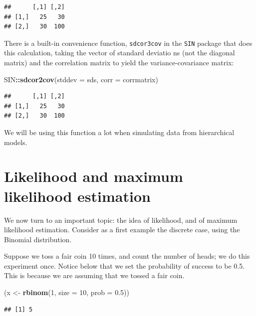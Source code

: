 \documentclass[12pt,]{krantz}
\newenvironment{Shaded}{\begin{snugshade}}{\end{snugshade}}
\newcommand{\DataTypeTok}[1]{\textcolor[rgb]{0.13,0.29,0.53}{#1}}
\newcommand{\DecValTok}[1]{\textcolor[rgb]{0.00,0.00,0.81}{#1}}
\newcommand{\FloatTok}[1]{\textcolor[rgb]{0.00,0.00,0.81}{#1}}
\newcommand{\KeywordTok}[1]{\textcolor[rgb]{0.13,0.29,0.53}{\textbf{#1}}}
\newcommand{\NormalTok}[1]{#1}
\newcommand{\OperatorTok}[1]{\textcolor[rgb]{0.81,0.36,0.00}{\textbf{#1}}}
\newcommand{\StringTok}[1]{\textcolor[rgb]{0.31,0.60,0.02}{#1}}
\begin{document}
\begin{verbatim}
##      [,1] [,2]
## [1,]   25   30
## [2,]   30  100
\end{verbatim}

There is a built-in convenience function, \texttt{sdcor3cov} in the \texttt{SIN} package that does this calculation, taking the vector of standard deviatio ns (not the diagonal matrix) and the correlation matrix to yield the variance-covariance matrix:

\begin{Shaded}
\begin{Highlighting}[]
\NormalTok{SIN}\OperatorTok{::}\KeywordTok{sdcor2cov}\NormalTok{(}\DataTypeTok{stddev =}\NormalTok{ sds, }\DataTypeTok{corr =}\NormalTok{ corrmatrix)}
\end{Highlighting}
\end{Shaded}

\begin{verbatim}
##      [,1] [,2]
## [1,]   25   30
## [2,]   30  100
\end{verbatim}

We will be using this function a lot when simulating data from hierarchical models.

\hypertarget{likelihood-and-maximum-likelihood-estimation}{%
\section{Likelihood and maximum likelihood estimation}\label{likelihood-and-maximum-likelihood-estimation}}

We now turn to an important topic: the idea of likelihood, and of maximum likelihood estimation. Consider as a first example the discrete case, using the Binomial distribution.

Suppose we toss a fair coin 10 times, and count the number of heads; we do this experiment once. Notice below that we set the probability of success to be 0.5. This is because we are assuming that we tossed a fair coin.

\begin{Shaded}
\begin{Highlighting}[]
\NormalTok{(x <-}\StringTok{ }\KeywordTok{rbinom}\NormalTok{(}\DecValTok{1}\NormalTok{, }\DataTypeTok{size =} \DecValTok{10}\NormalTok{, }\DataTypeTok{prob =} \FloatTok{0.5}\NormalTok{))}
\end{Highlighting}
\end{Shaded}

\begin{verbatim}
## [1] 5
\end{verbatim}
\end{document}

